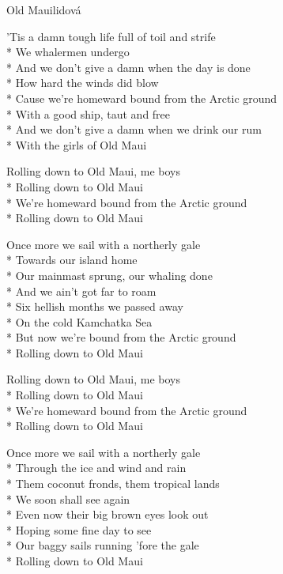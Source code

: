 \documentclass[10.5pt]{book}
\begin{document}
\begin{poem}{Old Maui}{lidová}

\settowidth{\versewidth}{Cause we're homeward bound from the Arctic ground}

'Tis a damn tough life full of toil and strife\\*
We whalermen undergo\\*
And we don't give a damn when the day is done\\*
How hard the winds did blow\\*
Cause we're homeward bound from the Arctic ground\\*
With a good ship, taut and free\\*
And we don't give a damn when we drink our rum\\*
With the girls of Old Maui

Rolling down to Old Maui, me boys\\*
Rolling down to Old Maui\\*
We're homeward bound from the Arctic ground\\*
Rolling down to Old Maui

Once more we sail with a northerly gale\\*
Towards our island home\\*
Our mainmast sprung, our whaling done\\*
And we ain't got far to roam\\*
Six hellish months we passed away\\*
On the cold Kamchatka Sea\\*
But now we're bound from the Arctic ground\\*
Rolling down to Old Maui

Rolling down to Old Maui, me boys\\*
Rolling down to Old Maui\\*
We're homeward bound from the Arctic ground\\*
Rolling down to Old Maui

Once more we sail with a northerly gale\\*
Through the ice and wind and rain\\*
Them coconut fronds, them tropical lands\\*
We soon shall see again\\*
Even now their big brown eyes look out\\*
Hoping some fine day to see\\*
Our baggy sails running 'fore the gale\\*
Rolling down to Old Maui


\end{poem}
\end{document}
